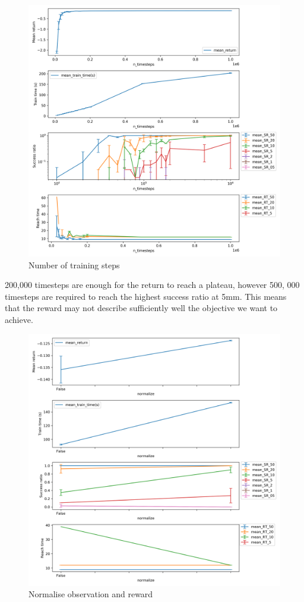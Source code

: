 \documentclass{article}
\begin{document}
\begin{figure}[H]
    \centering
    \includegraphics[width=\textwidth]{../ppo2_n_timesteps.png}
\caption{Number of training steps}
\end{figure}

200,000 timesteps are enough for the return to reach a plateau, however 500, 000 timesteps are required to reach the highest success ratio at 5mm. This means that the reward may not describe sufficiently well the objective we want to achieve.

\begin{figure}[H]
    \centering
    \includegraphics[width=\textwidth]{../ppo2_normalize.png}
\caption{Normalise observation and reward}
\end{figure}
\end{document}
